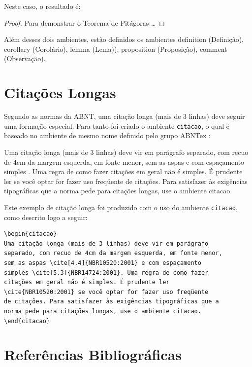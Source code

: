Neste caso, o resultado é:
\begin{proof}
Para demonstrar o Teorema de Pitágoras \dots
\end{proof}

Além desses dois ambientes, estão definidos os ambientes \textsf{definition}
(Definição), \textsf{corollary} (Corolário), \textsf{lemma} (Lema)),
\textsf{proposition} (Proposição), \textsf{comment} (Observação).

\section{Citações Longas}\label{sec:citacoes}

Segundo as normas da ABNT, uma citação longa (mais de 3 linhas) deve seguir uma
formação especial. Para tanto foi criado o ambiente \verb|citacao|, o qual é
baseado no ambiente de mesmo nome definido pelo grupo ABNTex
\cite{abnt-classe-doc}:

\begin{citacao}
  Uma citação longa (mais de 3 linhas) deve vir em parágrafo separado, com
  recuo de 4cm da margem esquerda, em fonte menor, sem as aspas
  \cite[4.4]{NBR10520:2001} e com espaçamento simples
  \cite[5.3]{NBR14724:2001}. Uma regra de como fazer citações em geral não é
  simples. É prudente ler \cite{NBR10520:2001} se você optar for fazer uso
  freqüente de citações. Para satisfazer às exigências tipográficas que a norma
  pede para citações longas, use o ambiente citacao.
\end{citacao}

Este exemplo de citação longa foi produzido com o uso do ambiente
\verb|citacao|, como descrito logo a seguir:

\begin{verbatim}
\begin{citacao}
Uma citação longa (mais de 3 linhas) deve vir em parágrafo
separado, com recuo de 4cm da margem esquerda, em fonte menor,
sem as aspas \cite[4.4]{NBR10520:2001} e com espaçamento
simples \cite[5.3]{NBR14724:2001}. Uma regra de como fazer
citações em geral não é simples. É prudente ler
\cite{NBR10520:2001} se você optar for fazer uso freqüente
de citações. Para satisfazer às exigências tipográficas que a
norma pede para citações longas, use o ambiente citacao.
\end{citacao}
\end{verbatim}

\section{Referências Bibliográficas}\label{sec:refs} 

